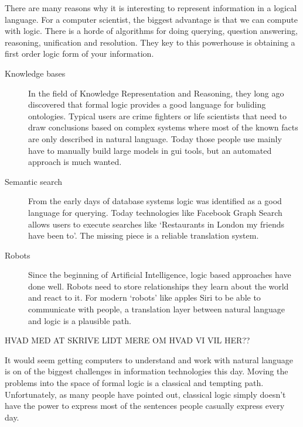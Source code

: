 \documentclass[12pt]{article}
\begin{document}

There are many reasons why it is interesting to represent information in a logical language. For a computer scientist, the biggest advantage is that we can compute with logic. There is a horde of algorithms for doing querying, question answering, reasoning, unification and resolution. They key to this powerhouse is obtaining a first order logic form of your information.

\begin{description}
\item[Knowledge bases] In the field of Knowledge Representation and Reasoning, they long ago discovered that formal logic provides a good language for buliding ontologies. Typical users are crime fighters or life scientists that need to draw conclusions based on complex systems\cite{malone2010modeling} where most of the known facts are only described in natural language. Today those people use mainly have to manually build large models in gui tools, but an automated approach is much wanted.

\item[Semantic search] From the early days of database systems logic was identified\cite{fagin1995reasoning} as a good language for querying. Today technologies like Facebook Graph Search allows users to execute searches like `Restaurants in London my friends have been to'. The missing piece is a reliable translation system.

\item[Robots] Since the beginning of Artificial Intelligence, logic based approaches have done well.\cite{russell2010artificial} Robots need to store relationships they learn about the world and react to it. For modern `robots' like apples Siri to be able to communicate with people, a translation layer between natural language and logic is a plausible path.
\end{description}

HVAD MED AT SKRIVE LIDT MERE OM HVAD VI VIL HER??

It would seem getting computers to understand and work with natural language is on of the biggest challenges in information technologies this day. Moving the problems into the space of formal logic is a classical and tempting path. Unfortunately, as many people have pointed out, classical logic simply doesn't have the power to express most of the sentences people casually express every day.
\end{document}
